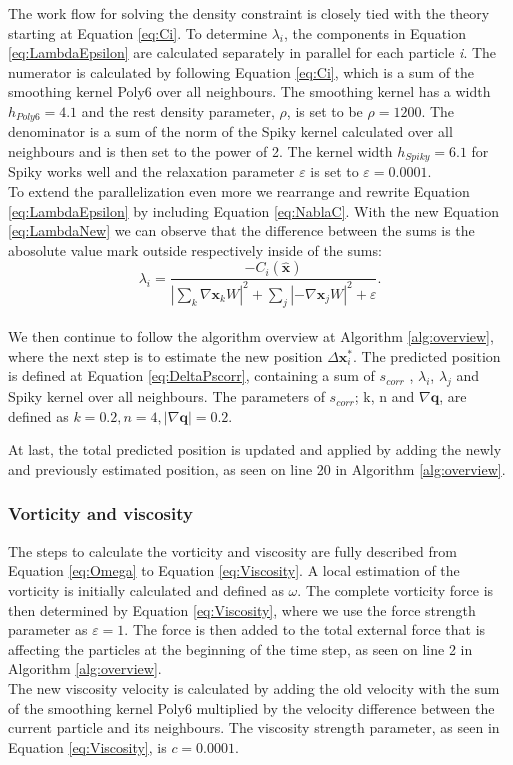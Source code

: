 The work flow for solving the density constraint is closely tied with the theory starting at Equation \ref{eq:Ci}. 
To determine $\lambda_{i}$, the components in Equation \ref{eq:LambdaEpsilon} are calculated separately in parallel 
for each particle \textit{i}.
The numerator is calculated by following Equation \ref{eq:Ci}, which is a sum of the smoothing kernel Poly6 over 
all neighbours. The smoothing kernel has a width $h_{Poly6} = 4.1$ and the rest density parameter, $\rho$, is set to be $\rho = 1200$. 
The denominator is a sum of the norm of the Spiky kernel calculated over all neighbours 
and is then set to the power of 2. The kernel width $h_{Spiky} = 6.1$ for Spiky works well and the 
relaxation parameter $\varepsilon$ is set to $\varepsilon = 0.0001$.
\\
\newline
To extend the parallelization even more we rearrange and rewrite Equation \ref{eq:LambdaEpsilon} by including Equation \ref{eq:NablaC}. With the 
new Equation \ref{eq:LambdaNew} we can observe that the difference between the sums is the abosolute value mark 
outside respectively inside of the sums: 
\\
\begin{equation}
\label{eq:LambdaNew}
\lambda_i = \frac{- C_i(\hat{\mathbf{x}}) }{ |\sum\limits_{k} \nabla \mathbf{x}_k W|^{2} + \sum\limits_{j} |-\nabla \mathbf{x}_j W|^2  + \varepsilon}.
\end{equation}
\\
\newline
We then continue to follow the algorithm overview at Algorithm \ref{alg:overview}, where the next step is to estimate the new position $\Delta \mathbf{x}^{*}_{i}$.
The predicted position is defined at Equation \ref{eq:DeltaPscorr}, containing a sum of $s_{corr}$ , $\lambda_{i}$, $\lambda_{j}$ 
and Spiky kernel over all neighbours. 
The parameters of $s_{corr}$; k, n and $ \nabla \mathbf{q}$, are defined as $k = 0.2, n = 4, |\nabla \mathbf{q}| = 0.2$. 

At last, the total predicted position is updated and applied by adding the newly and previously estimated position, 
as seen on line 20 in Algorithm \ref{alg:overview}.

\subsubsection{Vorticity and viscosity}
The steps to calculate the vorticity and viscosity are fully described from Equation \ref{eq:Omega} to Equation \ref{eq:Viscosity}.
A local estimation of the vorticity is initially calculated and defined as $\omega$. The complete vorticity force is then determined 
by Equation \ref{eq:Viscosity}, where we use the force strength parameter as $\varepsilon = 1$. The force is then added to the total 
external force that is affecting the particles at the beginning of the time step, as seen on line 2 in Algorithm \ref{alg:overview}. 
\\
The new viscosity velocity is calculated by adding the old velocity with the sum of the smoothing kernel Poly6 multiplied by the velocity difference between 
the current particle and its neighbours. The viscosity strength parameter, as seen in Equation \ref{eq:Viscosity}, is $c = 0.0001$. 